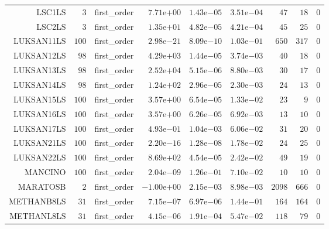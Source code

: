 \begin{longtable}{rrrrrrrrr}
LSC1LS & \(     3\) & first\_order & \( 7.71\)e\(+00\) & \( 1.43\)e\(-05\) & \( 3.51\)e\(-04\) & \(    47\) & \(    18\) & \(     0\) \\
LSC2LS & \(     3\) & first\_order & \( 1.35\)e\(+01\) & \( 4.82\)e\(-05\) & \( 4.21\)e\(-04\) & \(    45\) & \(    25\) & \(     0\) \\
LUKSAN11LS & \(   100\) & first\_order & \( 2.98\)e\(-21\) & \( 8.09\)e\(-10\) & \( 1.03\)e\(-01\) & \(   650\) & \(   317\) & \(     0\) \\
LUKSAN12LS & \(    98\) & first\_order & \( 4.29\)e\(+03\) & \( 1.44\)e\(-05\) & \( 3.74\)e\(-03\) & \(    40\) & \(    18\) & \(     0\) \\
LUKSAN13LS & \(    98\) & first\_order & \( 2.52\)e\(+04\) & \( 5.15\)e\(-06\) & \( 8.80\)e\(-03\) & \(    30\) & \(    17\) & \(     0\) \\
LUKSAN14LS & \(    98\) & first\_order & \( 1.24\)e\(+02\) & \( 2.96\)e\(-05\) & \( 2.30\)e\(-03\) & \(    24\) & \(    13\) & \(     0\) \\
LUKSAN15LS & \(   100\) & first\_order & \( 3.57\)e\(+00\) & \( 6.54\)e\(-05\) & \( 1.33\)e\(-02\) & \(    23\) & \(     9\) & \(     0\) \\
LUKSAN16LS & \(   100\) & first\_order & \( 3.57\)e\(+00\) & \( 6.26\)e\(-05\) & \( 6.92\)e\(-03\) & \(    13\) & \(    10\) & \(     0\) \\
LUKSAN17LS & \(   100\) & first\_order & \( 4.93\)e\(-01\) & \( 1.04\)e\(-03\) & \( 6.06\)e\(-02\) & \(    31\) & \(    20\) & \(     0\) \\
LUKSAN21LS & \(   100\) & first\_order & \( 2.20\)e\(-16\) & \( 1.28\)e\(-08\) & \( 1.78\)e\(-02\) & \(    24\) & \(    25\) & \(     0\) \\
LUKSAN22LS & \(   100\) & first\_order & \( 8.69\)e\(+02\) & \( 4.54\)e\(-05\) & \( 2.42\)e\(-02\) & \(    49\) & \(    19\) & \(     0\) \\
MANCINO & \(   100\) & first\_order & \( 2.04\)e\(-09\) & \( 1.26\)e\(-01\) & \( 7.10\)e\(-02\) & \(    10\) & \(    10\) & \(     0\) \\
MARATOSB & \(     2\) & first\_order & \(-1.00\)e\(+00\) & \( 2.15\)e\(-03\) & \( 8.98\)e\(-03\) & \(  2098\) & \(   666\) & \(     0\) \\
METHANB8LS & \(    31\) & first\_order & \( 7.15\)e\(-07\) & \( 6.97\)e\(-06\) & \( 1.44\)e\(-01\) & \(   164\) & \(   164\) & \(     0\) \\
METHANL8LS & \(    31\) & first\_order & \( 4.15\)e\(-06\) & \( 1.91\)e\(-04\) & \( 5.47\)e\(-02\) & \(   118\) & \(    79\) & \(     0\) \\

\end{longtable}
